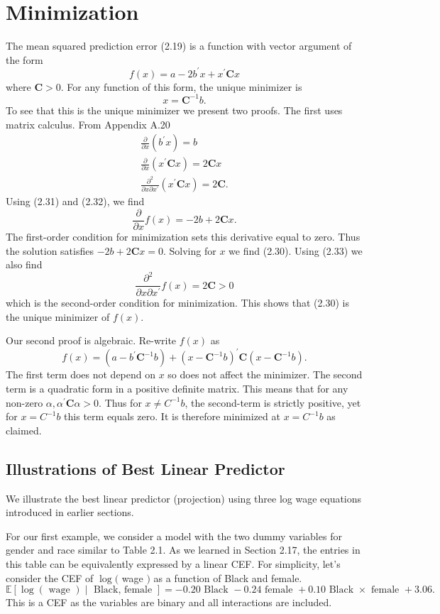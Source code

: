 \documentclass[10pt]{article}
\begin{document}
\section{Minimization}
The mean squared prediction error (2.19) is a function with vector argument of the form
$$
f(x)=a-2 b^{\prime} x+x^{\prime} \boldsymbol{C} x
$$
where $\boldsymbol{C}>0$. For any function of this form, the unique minimizer is
$$
x=\boldsymbol{C}^{-1} b .
$$
To see that this is the unique minimizer we present two proofs. The first uses matrix calculus. From Appendix A.20
$$
\begin{gathered}
\frac{\partial}{\partial x}\left(b^{\prime} x\right)=b \\
\frac{\partial}{\partial x}\left(x^{\prime} \boldsymbol{C} x\right)=2 \boldsymbol{C} x \\
\frac{\partial^{2}}{\partial x \partial x^{\prime}}\left(x^{\prime} \boldsymbol{C} x\right)=2 \boldsymbol{C} .
\end{gathered}
$$
Using (2.31) and (2.32), we find
$$
\frac{\partial}{\partial x} f(x)=-2 b+2 \boldsymbol{C} x .
$$
The first-order condition for minimization sets this derivative equal to zero. Thus the solution satisfies $-2 b+2 \boldsymbol{C} x=0$. Solving for $x$ we find (2.30). Using (2.33) we also find
$$
\frac{\partial^{2}}{\partial x \partial x^{\prime}} f(x)=2 \boldsymbol{C}>0
$$
which is the second-order condition for minimization. This shows that (2.30) is the unique minimizer of $f(x)$.

Our second proof is algebraic. Re-write $f(x)$ as
$$
f(x)=\left(a-b^{\prime} \boldsymbol{C}^{-1} b\right)+\left(x-\boldsymbol{C}^{-1} b\right)^{\prime} \boldsymbol{C}\left(x-\boldsymbol{C}^{-1} b\right) .
$$
The first term does not depend on $x$ so does not affect the minimizer. The second term is a quadratic form in a positive definite matrix. This means that for any non-zero $\alpha, \alpha^{\prime} \boldsymbol{C} \alpha>0$. Thus for $x \neq C^{-1} b$, the second-term is strictly positive, yet for $x=C^{-1} b$ this term equals zero. It is therefore minimized at $x=C^{-1} b$ as claimed.

\subsection{Illustrations of Best Linear Predictor}
We illustrate the best linear predictor (projection) using three log wage equations introduced in earlier sections.

For our first example, we consider a model with the two dummy variables for gender and race similar to Table 2.1. As we learned in Section 2.17, the entries in this table can be equivalently expressed by a linear CEF. For simplicity, let's consider the CEF of $\log ($ wage $)$ as a function of Black and female.
$$
\mathbb{E}[\log (\text { wage }) \mid \text { Black, female }]=-0.20 \text { Black }-0.24 \text { female }+0.10 \text { Black } \times \text { female }+3.06 \text {. }
$$
This is a CEF as the variables are binary and all interactions are included.
\end{document}
